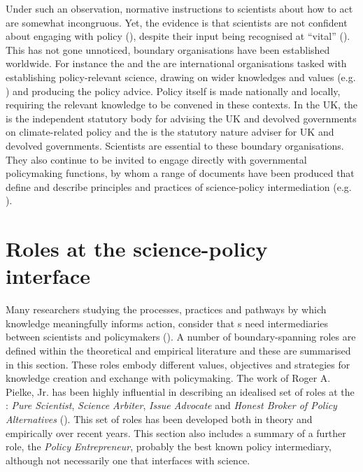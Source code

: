 Under such an observation, normative instructions to scientists about how to act are somewhat incongruous. Yet, the evidence is that scientists are not confident about engaging with policy (\cite{KEU2021perceptions}), despite their input being recognised at ``vital'' (\cite{KennyRHTB2017}). This has not gone unnoticed, \SPI{} boundary organisations have been established worldwide. For instance the \IPCC{} and the \IPBES{} are international organisations tasked with establishing policy-relevant science, drawing on wider knowledges and values (e.g. \cite{PascualEtAl2018,MatukBSAHT2020})  and producing the policy advice. Policy itself is made nationally and locally, requiring the relevant knowledge to be convened in these contexts. In the UK, the \CCC{} is the independent statutory body for advising the UK and devolved governments on climate-related policy and the \JNCC{} is the statutory nature adviser for UK and devolved governments. Scientists are essential to these boundary organisations. They also continue to be invited to engage directly with governmental policymaking functions, by whom a range of documents have been produced that define and describe principles and practices of science-policy intermediation (e.g. \cite{OECD2015,DottiACDMPSVW2024,KarkkainenLKK2024}). 

\section{Roles at the science-policy interface}\label{sec:litroles}

Many researchers studying the processes, practices and pathways by which knowledge meaningfully informs action, consider that \SPI s need intermediaries between scientists and policymakers (\cite{JagannathanEtAl2023}). A number of boundary-spanning roles are defined within the theoretical and empirical literature and these are summarised in this section. These roles embody different values, objectives and strategies for knowledge creation and exchange with policymaking. The work of Roger A. Pielke, Jr. has been highly influential in describing an idealised set of roles at the \SPI: \emph{Pure Scientist}, \emph{Science Arbiter}, \emph{Issue Advocate} and \emph{Honest Broker of Policy Alternatives} (\cite{Pielke2007}). This set of roles has been developed both in theory and empirically over recent years. This section also includes a summary of a further role, the \emph{Policy Entrepreneur}, probably the best known policy intermediary, although not necessarily one that interfaces with science.

